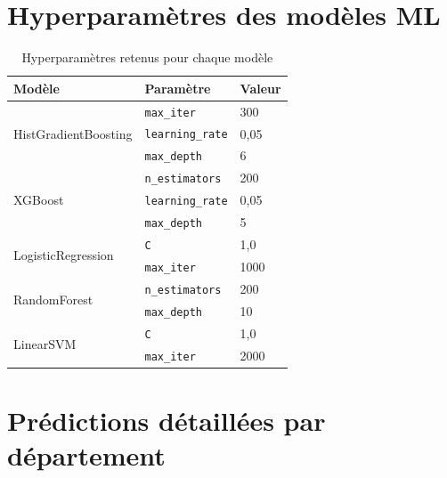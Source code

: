 \chapter{Hyperparamètres des modèles ML}
\label{ann:hyperparams}

\begin{table}[H]
\centering
\caption{Hyperparamètres retenus pour chaque modèle}
\label{tab:hyperparams}
\begin{tabular}{lll}
\toprule
\textbf{Modèle} & \textbf{Paramètre} & \textbf{Valeur} \\
\midrule
\multirow{3}{*}{HistGradientBoosting}
  & \texttt{max\_iter}     & 300  \\
  & \texttt{learning\_rate} & 0,05 \\
  & \texttt{max\_depth}    & 6    \\
\midrule
\multirow{3}{*}{XGBoost}
  & \texttt{n\_estimators} & 200  \\
  & \texttt{learning\_rate} & 0,05 \\
  & \texttt{max\_depth}    & 5    \\
\midrule
\multirow{2}{*}{LogisticRegression}
  & \texttt{C}             & 1,0  \\
  & \texttt{max\_iter}     & 1000 \\
\midrule
\multirow{2}{*}{RandomForest}
  & \texttt{n\_estimators} & 200  \\
  & \texttt{max\_depth}    & 10   \\
\midrule
\multirow{2}{*}{LinearSVM}
  & \texttt{C}             & 1,0  \\
  & \texttt{max\_iter}     & 2000 \\
\bottomrule
\end{tabular}
\end{table}

\chapter{Prédictions détaillées par département}
\label{ann:dept_detail}

